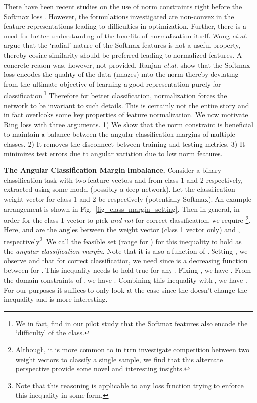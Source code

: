 \documentclass[10pt,twocolumn,letterpaper]{article}
\begin{document}
 There have been recent studies on the use of norm constraints right before the Softmax loss \cite{Wang2017NormFace, ranjan2017l2}. However, the formulations investigated are non-convex in the feature representations leading to difficulties in optimization. Further, there is a need for better understanding of the benefits of normalization itself. Wang \emph{et.al.} \cite{Wang2017NormFace} argue that the `radial' nature of the Softmax features is not a useful property, thereby cosine similarity should be preferred leading to normalized features. A concrete reason was, however, not provided. Ranjan \emph{et.al.} \cite{ranjan2017l2} show that the Softmax loss encodes the quality of the data (images) into the norm thereby deviating from the ultimate objective of learning a good representation purely for classification.\footnote{We in fact, find in our pilot study that the Softmax features also encode the `difficulty' of the class.} Therefore for better classification, normalization forces the network to be invariant to such details. This is certainly not the entire story and in fact overlooks some key properties of feature normalization. We now motivate Ring loss with three arguments. 1) We show that the norm constraint is beneficial to maintain a balance between the angular classification margins of multiple classes. 2) It removes the disconnect between training and testing metrics. 3) It minimizes test errors due to angular variation due to low norm features.   






\textbf{The Angular Classification Margin Imbalance. } Consider a binary classification task with two feature vectors  and  from class 1 and 2 respectively, extracted using some model (possibly a deep network). Let the classification weight vector for class 1 and 2 be  respectively (potentially Softmax). An example arrangement is shown in Fig.~\ref{fig_class_margin_setting}. Then in general, in order for the class 1 vector  to pick  \textit{and not}  for correct classification, we require \footnote{Although, it is more common to in turn investigate competition between two weight vectors to classify a single sample, we find that this alternate perspective provide some novel and interesting insights.}. Here,  and  are the angles between the weight vector  (class 1 vector only) and ,  respectively\footnote{Note that this reasoning is applicable to any loss function trying to enforce this inequality in some form.}.  We call the feasible set (range for ) for this inequality to hold as the \textit{angular classification margin}. Note that it is also a function of .  Setting , we observe  and that for correct classification, we need  since  is a decreasing function between  for . This inequality needs to hold true for any . Fixing , we have . From the domain constraints of , we have . Combining this inequality with , we have . For our purposes it suffices to only look at the case  since the  doesn't change the inequality  and is more interesting. 
\end{document}
